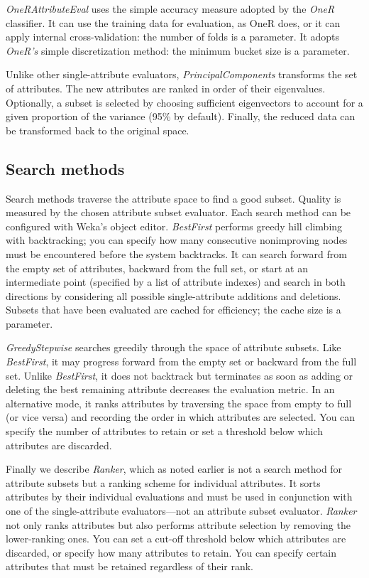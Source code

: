 \textit{OneRAttributeEval} uses the simple accuracy measure adopted by
the \textit{OneR} classifier. It can use the training data for
evaluation, as OneR does, or it can apply internal cross-validation:
the number of folds is a parameter. It adopts \textit{OneR’s} simple
discretization method: the minimum bucket size is a parameter.

Unlike other single-attribute evaluators, \textit{PrincipalComponents}
transforms the set of attributes. The new attributes are ranked in
order of their eigenvalues. Optionally, a subset is selected by
choosing sufficient eigenvectors to account for a given proportion of
the variance (95\% by default). Finally, the reduced data can be
transformed back to the original space.

\subsection{Search methods}

Search methods traverse the attribute space to find a good
subset. Quality is measured by the chosen attribute subset
evaluator. Each search method can be configured with Weka's object
editor. \textit{BestFirst} performs greedy hill climbing with
backtracking; you can specify how many consecutive nonimproving nodes
must be encountered before the system backtracks. It can search
forward from the empty set of attributes, backward from the full set,
or start at an intermediate point (specified by a list of attribute
indexes) and search in both directions by considering all possible
single-attribute additions and deletions. Subsets that have been
evaluated are cached for efficiency; the cache size is a parameter.

\textit{GreedyStepwise} searches greedily through the space of
attribute subsets. Like \textit{BestFirst}, it may progress forward
from the empty set or backward from the full set. Unlike
\textit{BestFirst}, it does not backtrack but terminates as soon as
adding or deleting the best remaining attribute decreases the
evaluation metric. In an alternative mode, it ranks attributes by
traversing the space from empty to full (or vice versa) and recording
the order in which attributes are selected. You can specify the number
of attributes to retain or set a threshold below which attributes are
discarded.

Finally we describe \textit{Ranker}, which as noted earlier is not a
search method for attribute subsets but a ranking scheme for
individual attributes. It sorts attributes by their individual
evaluations and must be used in conjunction with one of the
single-attribute evaluators---not an attribute subset
evaluator. \textit{Ranker} not only ranks attributes but also performs
attribute selection by removing the lower-ranking ones. You can set a
cut-off threshold below which attributes are discarded, or specify how
many attributes to retain. You can specify certain attributes that
must be retained regardless of their rank.

